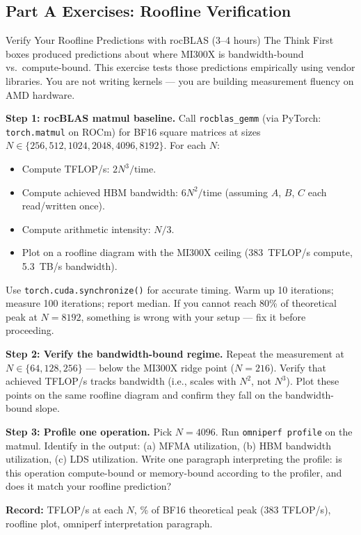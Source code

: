 \subsection{Part A Exercises: Roofline Verification}

\begin{exercise}{Verify Your Roofline Predictions with rocBLAS (3--4 hours)}
The Think First boxes produced predictions about where MI300X is bandwidth-bound vs.\ compute-bound. This exercise tests those predictions empirically using vendor libraries. You are not writing kernels --- you are building measurement fluency on AMD hardware.

\textbf{Step 1: rocBLAS matmul baseline.}
Call \texttt{rocblas\_gemm} (via PyTorch: \texttt{torch.matmul} on ROCm) for BF16 square matrices at sizes $N \in \{256, 512, 1024, 2048, 4096, 8192\}$. For each $N$:
\begin{itemize}
  \item Compute TFLOP/s: $2N^3 / \text{time}$.
  \item Compute achieved HBM bandwidth: $6N^2 / \text{time}$ (assuming $A$, $B$, $C$ each read/written once).
  \item Compute arithmetic intensity: $N/3$.
  \item Plot on a roofline diagram with the MI300X ceiling (383~TFLOP/s compute, 5.3~TB/s bandwidth).
\end{itemize}

Use \texttt{torch.cuda.synchronize()} for accurate timing. Warm up 10 iterations; measure 100 iterations; report median. If you cannot reach 80\% of theoretical peak at $N = 8192$, something is wrong with your setup --- fix it before proceeding.

\textbf{Step 2: Verify the bandwidth-bound regime.}
Repeat the measurement at $N \in \{64, 128, 256\}$ --- below the MI300X ridge point ($N = 216$). Verify that achieved TFLOP/s tracks bandwidth (i.e., scales with $N^2$, not $N^3$). Plot these points on the same roofline diagram and confirm they fall on the bandwidth-bound slope.

\textbf{Step 3: Profile one operation.}
Pick $N = 4096$. Run \texttt{omniperf profile} on the matmul. Identify in the output: (a) MFMA utilization, (b) HBM bandwidth utilization, (c) LDS utilization. Write one paragraph interpreting the profile: is this operation compute-bound or memory-bound according to the profiler, and does it match your roofline prediction?

\textbf{Record:} TFLOP/s at each $N$, \% of BF16 theoretical peak (383 TFLOP/s), roofline plot, omniperf interpretation paragraph.
\end{exercise}

